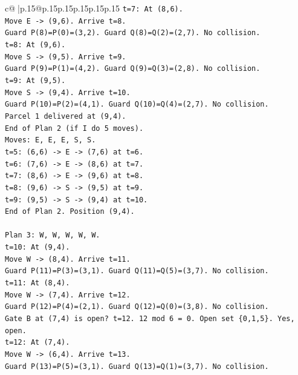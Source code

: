 \documentclass{article}
\begin{document}
{\begin{supertabular}{c@{$\;$}|p{.15\linewidth}@{}p{.15\linewidth}p{.15\linewidth}p{.15\linewidth}p{.15\linewidth}p{.15\linewidth}}
{{{\texttt{t=7: At (8,6).} \\
\texttt{Move E {-}> (9,6). Arrive t=8.} \\
\texttt{Guard P(8)=P(0)=(3,2). Guard Q(8)=Q(2)=(2,7). No collision.} \\
\texttt{t=8: At (9,6).} \\
\texttt{Move S {-}> (9,5). Arrive t=9.} \\
\texttt{Guard P(9)=P(1)=(4,2). Guard Q(9)=Q(3)=(2,8). No collision.} \\
\texttt{t=9: At (9,5).} \\
\texttt{Move S {-}> (9,4). Arrive t=10.} \\
\texttt{Guard P(10)=P(2)=(4,1). Guard Q(10)=Q(4)=(2,7). No collision.} \\
\texttt{Parcel 1 delivered at (9,4).} \\
\texttt{End of Plan 2 (if I do 5 moves).} \\
\texttt{Moves: E, E, E, S, S.} \\
\texttt{t=5: (6,6) {-}> E {-}> (7,6) at t=6.} \\
\texttt{t=6: (7,6) {-}> E {-}> (8,6) at t=7.} \\
\texttt{t=7: (8,6) {-}> E {-}> (9,6) at t=8.} \\
\texttt{t=8: (9,6) {-}> S {-}> (9,5) at t=9.} \\
\texttt{t=9: (9,5) {-}> S {-}> (9,4) at t=10.} \\
\texttt{End of Plan 2. Position (9,4).} \\
\\ 
\texttt{Plan 3: W, W, W, W, W.} \\
\texttt{t=10: At (9,4).} \\
\texttt{Move W {-}> (8,4). Arrive t=11.} \\
\texttt{Guard P(11)=P(3)=(3,1). Guard Q(11)=Q(5)=(3,7). No collision.} \\
\texttt{t=11: At (8,4).} \\
\texttt{Move W {-}> (7,4). Arrive t=12.} \\
\texttt{Guard P(12)=P(4)=(2,1). Guard Q(12)=Q(0)=(3,8). No collision.} \\
\texttt{Gate B at (7,4) is open? t=12. 12 mod 6 = 0. Open set \{0,1,5\}. Yes, open.} \\
\texttt{t=12: At (7,4).} \\
\texttt{Move W {-}> (6,4). Arrive t=13.} \\
\texttt{Guard P(13)=P(5)=(3,1). Guard Q(13)=Q(1)=(3,7). No collision.} \\
}}}
\end{supertabular}}
\end{document}
